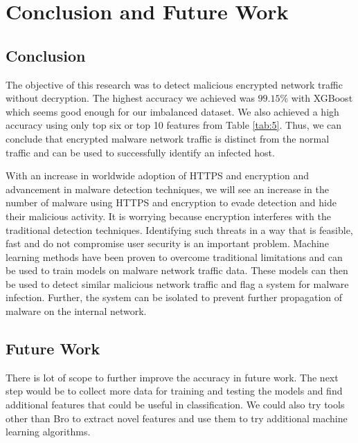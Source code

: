 \chapter{Conclusion and Future Work\label{chap:conclusion}}

\section{Conclusion}

The objective of this research was to detect malicious encrypted network traffic without decryption. The highest accuracy we achieved was $99.15$\% with XGBoost which seems good enough for our imbalanced dataset. We also achieved a high accuracy using only top six or top 10 features from Table \ref{tab:5}. Thus, we can conclude that encrypted malware network traffic is distinct from the normal traffic and can be used to successfully identify an infected host.

With an increase in worldwide adoption of HTTPS and encryption and advancement in malware detection techniques, we will see an increase in the number of malware using HTTPS and encryption to evade detection and hide their malicious activity. It is worrying because encryption interferes with the traditional detection techniques. Identifying such threats in a way that is feasible, fast and do not compromise user security is an important problem. Machine learning methods have been proven to overcome traditional limitations and can be used to train models on malware network traffic data. These models can then be used to detect similar malicious network traffic and flag a system for malware infection. Further, the system can be isolated to prevent further propagation of malware on the internal network.

\section{Future Work}

There is lot of scope to further improve the accuracy in future work. The next step would be to collect more data for training and testing the models and find additional features that could be useful in classification. We could also try tools other than Bro to extract novel features and use them to try additional machine learning algorithms. 